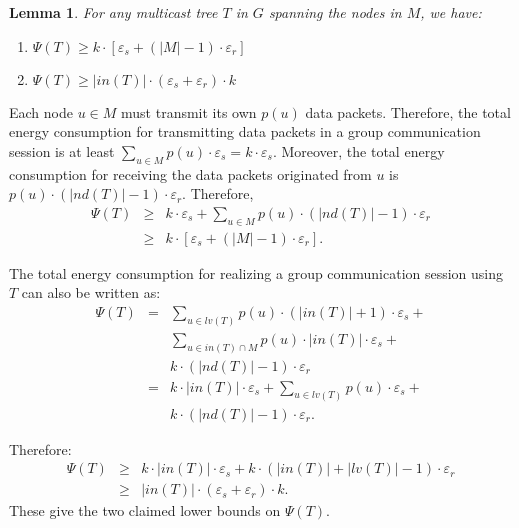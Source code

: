 \documentclass[10pt, conference, compsocconf]{IEEEtran}
\newtheorem{lemma}{\textbf{Lemma}}
\begin{document}
    \begin{lemma}
For any multicast tree $T$ in $G$ spanning the nodes in $M$, we have:
\begin{enumerate}
\item $\Psi (T) \ge k \cdot \left[{\varepsilon _s} + (|M| - 1) \cdot {\varepsilon _r}\right]$
\item $\Psi (T) \ge |\mathit{in}(T)| \cdot ({\varepsilon _s} + {\varepsilon _r}) \cdot k$
\end{enumerate}
      \label{lma:lowebound}
\end{lemma}
\begin{IEEEproof}
Each node $u \in M$ must transmit its own $p(u)$ data packets. Therefore, the total energy consumption for transmitting data packets in a group communication session is at least $\sum_{u \in M} {p(u) \cdot {\varepsilon_s}}=k \cdot {\varepsilon _s}$. Moreover, the total energy consumption for receiving the data packets originated from $u$ is $p(u) \cdot (|\mathit{nd}(T)| - 1) \cdot {\varepsilon _r}$. Therefore,
\begin{eqnarray}
        \Psi (T) &\ge& k \cdot {\varepsilon _s} + \sum_{u \in M} {p(u) \cdot (|\mathit{nd}(T)| - 1) \cdot {\varepsilon _r}} \nonumber\\
        &\ge& k \cdot \left[{\varepsilon _s} + (|M| - 1) \cdot {\varepsilon _r}\right]. \nonumber
      \end{eqnarray}

      The total energy consumption for realizing a group communication session using $T$ can also be written as:
\begin{eqnarray}
        \Psi (T) &=& \sum\nolimits_{u \in \mathit{lv}(T)} p(u) \cdot \left(|in(T)| + 1 \right) \cdot {\varepsilon _s} + \nonumber \\
        && \sum\nolimits_{u \in \mathit{in}(T) \cap M} {p(u) \cdot |\mathit{in}(T)|}  \cdot {\varepsilon _s} + \nonumber \\
        && k \cdot \left(|\mathit{nd}(T)| - 1\right) \cdot {\varepsilon _r} \nonumber \\
        &=& k \cdot |\mathit{in}(T)| \cdot \varepsilon _s + \sum\nolimits_{u \in \mathit{lv}(T)} p(u) \cdot \varepsilon _s + \nonumber \\
        && k \cdot (|\mathit{nd}(T)| - 1) \cdot {\varepsilon _r}. \label{eq:te}
      \end{eqnarray}

      Therefore:
\begin{eqnarray}
        \Psi (T) &\ge& k \cdot |in(T)| \cdot {\varepsilon _s} + k \cdot \left(|in(T)|+|lv(T)| - 1\right) \cdot \varepsilon _r \nonumber \\
        &\ge& |in(T)| \cdot ({\varepsilon _s} + {\varepsilon _r}) \cdot k. \nonumber
      \end{eqnarray}
These give the two claimed lower bounds on $\Psi(T)$.
    \end{IEEEproof}
\end{document}
